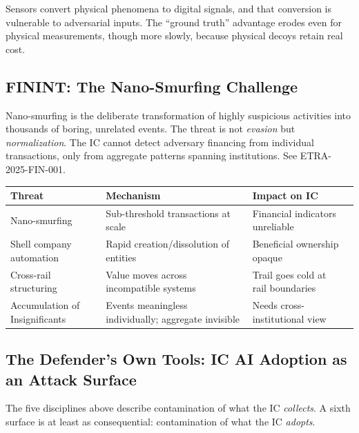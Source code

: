 \documentclass[11pt,letterpaper]{article}
\begin{document}
Sensors convert physical phenomena to digital signals, and that conversion is vulnerable to adversarial inputs. The ``ground truth'' advantage erodes even for physical measurements, though more slowly, because physical decoys retain real cost.

\subsection{FININT: The Nano-Smurfing Challenge}

\begin{defbox}
Nano-smurfing is the deliberate transformation of highly suspicious activities into thousands of boring, unrelated events. The threat is not \textit{evasion} but \textit{normalization}. The IC cannot detect adversary financing from individual transactions, only from aggregate patterns spanning institutions. See ETRA-2025-FIN-001.
\end{defbox}

\begin{center}
\small
\begin{tabularx}{\linewidth}{ZY{0.81}Y{1.04}Y{1.15}}
\toprule
\textbf{Threat} & \textbf{Mechanism} & \textbf{Impact on IC} \\
\midrule
Nano-smurfing & Sub-threshold transactions at scale & Financial indicators unreliable \\
Shell company automation & Rapid creation/dissolution of entities & Beneficial ownership opaque \\
Cross-rail structuring & Value moves across incompatible systems & Trail goes cold at rail boundaries \\
Accumulation of Insignificants & Events meaningless individually; aggregate invisible & Needs cross-institutional view \\
\bottomrule
\end{tabularx}
\end{center}

\subsection{The Defender's Own Tools: IC AI Adoption as an Attack Surface}

The five disciplines above describe contamination of what the IC \textit{collects}. A sixth surface is at least as consequential: contamination of what the IC \textit{adopts}.
\end{document}
